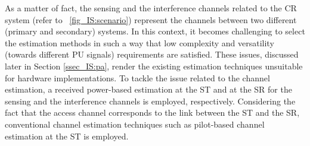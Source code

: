As a matter of fact, the sensing and the interference channels related to the CR system (refer to \figurename~\ref{fig_IS:scenario}) represent the channels between two different (primary and secondary) systems. In this context, it becomes challenging to select the estimation methods in such a way that low complexity and versatility (towards different PU signals) requirements are satisfied. These issues, discussed later in Section \ref{ssec_IS:pa}, render the existing estimation techniques \cite{Stoica03, Gifford05, Gifford08, Chav11, Sharma13} unsuitable for hardware implementations. 
To tackle the issue related to the channel estimation, a received power-based estimation at the ST and at the SR for the sensing and the interference channels is employed, respectively.
Considering the fact that the access channel corresponds to the link between the ST and the SR, conventional channel estimation techniques such as pilot-based channel estimation at the ST is employed.

